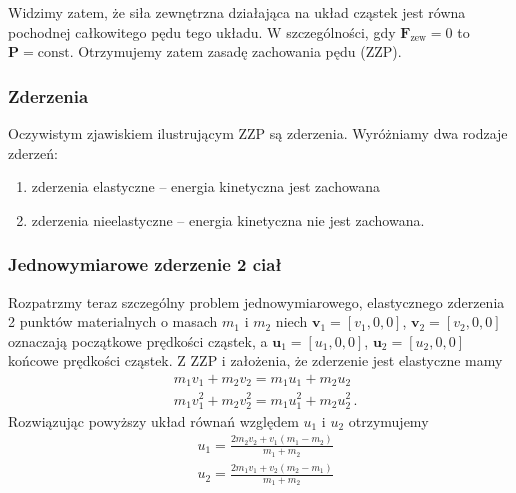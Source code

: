 \documentclass[../main.tex]{subfiles}
\begin{document}
Widzimy zatem, że siła zewnętrzna działająca na układ cząstek jest równa pochodnej całkowitego pędu
tego układu. W szczególności, gdy \(\mathbf{F}_\text{zew}=0\) to \(\mathbf{P}=\text{const}\).
Otrzymujemy zatem zasadę zachowania pędu (ZZP).
\medskip

\noindent{}
\subsubsection{Zderzenia}
Oczywistym zjawiskiem ilustrującym ZZP są zderzenia. Wyróżniamy dwa rodzaje zderzeń:
\begin{enumerate}
    \item zderzenia elastyczne -- energia kinetyczna jest zachowana 
    \item zderzenia nieelastyczne -- energia kinetyczna nie jest zachowana. 
\end{enumerate}
\subsubsection*{Jednowymiarowe zderzenie 2 ciał}
Rozpatrzmy teraz szczególny problem jednowymiarowego, elastycznego zderzenia 2 punktów materialnych
o masach \(m_1\) i \(m_2\) niech \(\mathbf{v}_1=[v_1,0,0]\), \(\mathbf{v}_2=[v_2,0,0]\) oznaczają
początkowe prędkości cząstek, a \(\mathbf{u}_1=[u_1,0,0]\), \(\mathbf{u}_2=[u_2,0,0]\) końcowe
prędkości cząstek. Z ZZP i założenia, że zderzenie jest elastyczne mamy
\begin{equation*}
\begin{split}
    &m_1v_1+m_2v_2=m_1u_1+m_2u_2\\
    &m_1v_1^2+m_2v_2^2=m_1u_1^2+m_2u_2^2\,.
\end{split}
\end{equation*}
Rozwiązując powyższy układ równań względem \(u_1\) i \(u_2\) otrzymujemy
\begin{equation*}
    \begin{split}
        &u_1=\frac{2m_2v_2+v_1(m_1-m_2)}{m_1+m_2}\\
        &u_2=\frac{2m_1v_1+v_2(m_2-m_1)}{m_1+m_2}
    \end{split}
\end{equation*}
\end{document}
